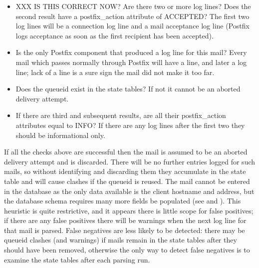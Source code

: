 \begin{itemize}

    \item XXX IS THIS CORRECT NOW\@?\newline{}  Are there two or more
         log lines?  Does the second result have a
        postfix\_action attribute of ACCEPTED\@?  The first two
         log lines will be a connection log line and a mail
        acceptance log line (Postfix logs acceptance as soon as the first
        recipient has been accepted).

    \item Is  the only Postfix component that produced a log
        line for this mail?  Every mail which passes normally through
        Postfix will have a  line, and later a
         log line; lack of a  line is a sure
        sign the mail did not make it too far.

    \item Does the queueid exist in the state tables?  If not it cannot be
        an aborted delivery attempt.

    \item If there are third and subsequent results, are all their
        postfix\_action attributes equal to INFO\@?  If there are any log
        lines after the first two they should be informational only.

\end{itemize}

If all the checks above are successful then the mail is assumed to be an
aborted delivery attempt and is discarded.  There will be no further
entries logged for such mails, so without identifying and discarding them
they accumulate in the state table and will cause clashes if the queueid is
reused.  The mail cannot be entered in the database as the only data
available is the client hostname and  address, but the database
schema requires many more fields be populated (see  and ).  This heuristic is quite
restrictive, and it appears there is little scope for false positives; if
there are any false positives there will be warnings when the next log line
for that mail is parsed.  False negatives are less likely to be detected:
there may be queueid clashes (and warnings) if mails remain in the state
tables after they should have been removed, otherwise the only way to
detect false negatives is to examine the state tables after each parsing
run.

